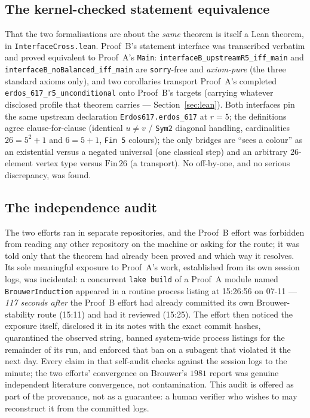 \documentclass[11pt,reqno]{amsart}
\theoremstyle{definition}
\theoremstyle{remark}
\begin{document}
\subsection{The kernel-checked statement equivalence}
That the two formalisations are about the \emph{same} theorem is itself a Lean theorem, in
\texttt{InterfaceCross.lean}. Proof~B's statement interface was transcribed verbatim and
proved equivalent to Proof~A's \texttt{Main}:
\texttt{interfaceB\_\allowbreak upstreamR5\_\allowbreak iff\_main} and
\texttt{interfaceB\_\allowbreak noBalanced\_\allowbreak iff\_main}
are \texttt{sorry}-free and \emph{axiom-pure} (the three standard axioms only), and two
corollaries transport Proof~A's completed \texttt{erdos\_617\_r5\_unconditional} onto
Proof~B's targets (carrying whatever disclosed profile that theorem carries ---
Section~\ref{sec:lean}). Both interfaces pin the same
upstream declaration \texttt{Erdos617.erdos\_617} at $r=5$; the definitions agree
clause-for-clause (identical $u\ne v$ / \texttt{Sym2} diagonal handling, cardinalities
$26=5^2+1$ and $6=5+1$, \texttt{Fin 5} colours); the only bridges are ``sees a colour'' as
an existential versus a negated universal (one classical step) and an arbitrary
$26$-element vertex type versus $\mathrm{Fin}\,26$ (a transport). No off-by-one, and no
serious discrepancy, was found.

\subsection{The independence audit}
The two efforts ran in separate repositories, and the Proof~B effort was forbidden from
reading any other repository on the machine or asking for the route; it was told only that
the theorem had already been proved and which way it resolves. Its sole meaningful
exposure to Proof~A's work, established from its own session logs, was incidental: a
concurrent \texttt{lake build} of a Proof~A module named \texttt{BrouwerInduction} appeared
in a routine process listing at 15:26:56 on 07-11 --- \emph{117 seconds after} the Proof~B
effort had already committed its own Brouwer-stability route (15:11) and had it reviewed
(15:25). The effort then noticed the exposure itself, disclosed it in its notes with the
exact commit hashes, quarantined the observed string, banned system-wide process listings
for the remainder of its run, and enforced that ban on a subagent that violated it the next
day. Every claim in that self-audit checks against the session logs to the minute; the two
efforts' convergence on Brouwer's $1981$ report was genuine independent literature
convergence, not contamination. This audit is offered as part of the provenance, not as a
guarantee: a human verifier who wishes to may reconstruct it from the committed logs.
\end{document}
